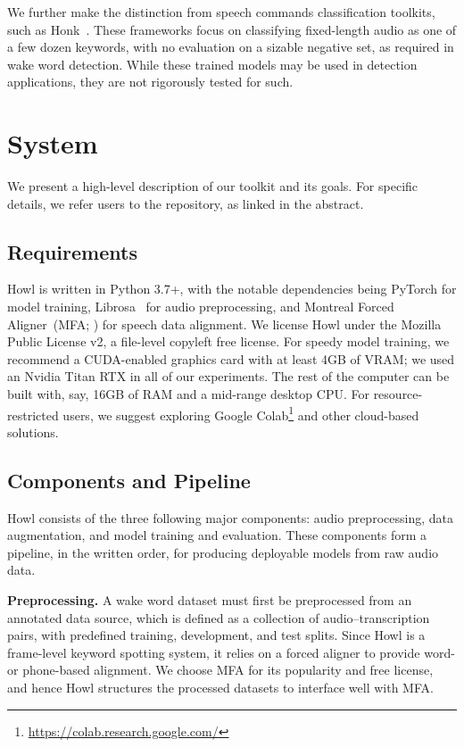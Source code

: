 \documentclass[11pt,a4paper]{article}
\newcommand{\parheader}[1]{{\smallskip \noindent \bf #1.}}
\begin{document}
We further make the distinction from speech commands classification toolkits, such as Honk~\cite{tang2017honk}.
These frameworks focus on classifying fixed-length audio as one of a few dozen keywords, with no evaluation on a sizable negative set, as required in wake word detection.
While these trained models may be used in detection applications, they are not rigorously tested for such.



\section{System}

We present a high-level description of our toolkit and its goals.
For specific details, we refer users to the repository, as linked in the abstract.

\subsection{Requirements}
Howl is written in Python 3.7+, with the notable dependencies being PyTorch for model training, Librosa~\cite{mcfee2015librosa} for audio preprocessing, and Montreal Forced Aligner~(MFA; \citealp{mcauliffe2017montreal}) for speech data alignment.
We license Howl under the Mozilla Public License v2, a file-level copyleft free license.
For speedy model training, we recommend a CUDA-enabled graphics card with at least 4GB of VRAM; we used an Nvidia Titan RTX in all of our experiments.
The rest of the computer can be built with, say, 16GB of RAM and a mid-range desktop CPU.
For resource-restricted users, we suggest exploring Google Colab\footnote{\url{https://colab.research.google.com/}} and other cloud-based solutions.

\subsection{Components and Pipeline}
Howl consists of the three following major components: audio preprocessing, data augmentation, and model training and evaluation.
These components form a pipeline, in the written order, for producing deployable models from raw audio data.

\parheader{Preprocessing}
A wake word dataset must first be preprocessed from an annotated data source, which is defined as a collection of audio--transcription pairs, with predefined training, development, and test splits.
Since Howl is a frame-level keyword spotting system, it relies on a forced aligner to provide word- or phone-based alignment.
We choose MFA for its popularity and free license, and hence Howl structures the processed datasets to interface well with MFA.
\end{document}
